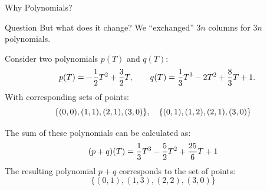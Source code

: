 \documentclass{zkdl-presentation-template}
\begin{document}
    \begin{frame}{Why Polynomials?}
        \begin{questionblock}{Question}
            But what does it change? We ``exchanged'' $3n$ columns for $3n$ polynomials.
        \end{questionblock}
        \pause

        \vspace{-5pt}
        Consider two polynomials $p(T)$ and $q(T)$:
        \begin{equation*}
            \quad p(T) = -\frac{1}{2}T^2 + \frac{3}{2}T, \qquad
            q(T) = \frac{1}{3}T^3 - 2T^2 + \frac{8}{3}T + 1.
            \vspace{-5pt}
        \end{equation*}
        With corresponding sets of points:
        \vspace{-5pt}
        \begin{equation*}
            \{(0, 0), (1, 1), (2, 1), (3, 0)\}, \quad \{(0, 1), (1, 2), (2, 1), (3, 0)\}
            \vspace{-10pt}
        \end{equation*}
        \pause

        The sum of these polynomials can be calculated as:
        \vspace{-5pt}
        \begin{equation*}
            (p+q)(T) = \frac{1}{3}T^3 - \frac{5}{2}T^2 + \frac{25}{6}T + 1
            \vspace{-5pt}
        \end{equation*}
        The resulting polynomial $p+q$ corresponds to the set of points:
        \vspace{-5pt}
        \begin{equation*}
            \{(0, 1), (1, 3), (2, 2), (3, 0)\}
        \end{equation*}
    \end{frame}
\end{document}

